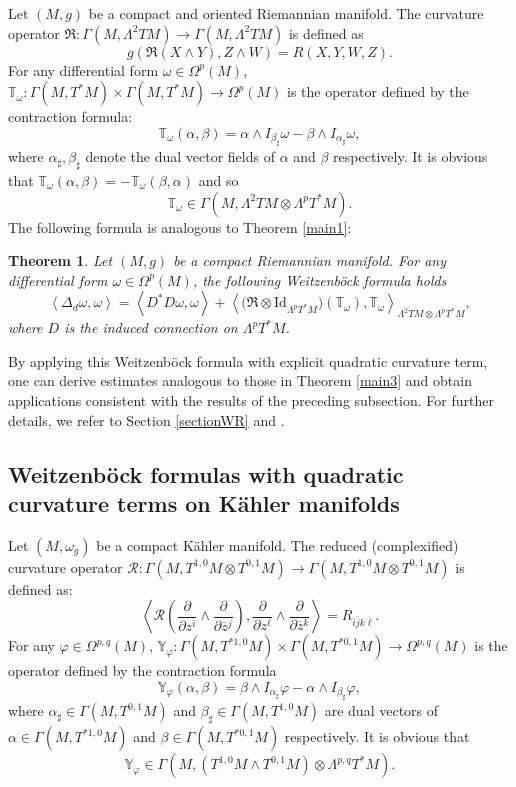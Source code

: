 \documentclass[12pt, reqno]{amsart}
\theoremstyle{plain}
\newtheorem{thm}{Theorem}[section]
\theoremstyle{definition}
\newcommand{\btheorem}{\begin{thm}}
\newcommand{\etheorem}{\end{thm}}
\newcommand{\p}{\partial}
\renewcommand{\bar}{\overline}
\renewcommand{\phi}{\varphi}
\newcommand{\beq}{\begin{equation}}
\newcommand{\eeq}{\end{equation}}
\newcommand{\Om}{\Omega}
\renewcommand{\>}{\rightarrow}
\renewcommand{\#}{\sharp}
\numberwithin{equation}{section} %
\begin{document}
    Let $(M,g)$ be a compact and oriented Riemannian manifold. The curvature operator
    $\mathfrak R: \Gamma(M,\Lambda^2TM) \to \Gamma(M,\Lambda^2TM)$
    is defined as
    \beq
    g(\mathfrak R(X\wedge Y), Z\wedge W) = R(X,Y,W,Z).\eeq
    For any   differential form $\omega\in \Om^{p}(M)$,
    $ \mathbb{T}_\omega: \Gamma(M,T^*M)\times  \Gamma(M,T^*M)\>\Om^{p}(M)$ is the operator defined
    by the contraction formula: \beq  \mathbb T_\omega(\alpha,\beta) =  \alpha \wedge I_{\beta_\#} \omega - \beta \wedge I_{\alpha_\#} \omega,\eeq
    where $ \alpha_\#, \beta_\#  $ denote the dual vector fields of $\alpha$ and $\beta$ respectively.  It is obvious that  $\mathbb T_\omega(\alpha,\beta) =- \mathbb T_\omega(\beta,\alpha)$ and so \beq  \mathbb T_\omega \in \Gamma\left(M,\Lambda^2TM\otimes \Lambda^{p}T^*M\right).\eeq
    \noindent The following formula is analogous to Theorem \ref{main1}:
    \btheorem\label{main8} Let $(M,g)$ be a compact Riemannian manifold.
    For any   differential form $ \omega \in \Omega^p(M) $, the following Weitzenb\"ock formula  holds
    \beq \left\langle\Delta_d \omega, \omega\right\rangle = \left\langle D^*D \omega, \omega\right\rangle + \left\langle \big(\mathfrak{R}\otimes \mathrm{Id}_{\Lambda^pT^*M}\big)\left(\mathbb T_\omega\right),\mathbb T_\omega \right\rangle_{\Lambda^2TM \otimes \Lambda^pT^*M },\eeq
    where $D$ is the induced connection on $\Lambda^pT^*M$.
    \etheorem
    \noindent By applying this Weitzenböck formula with explicit quadratic curvature term, one can derive estimates analogous to those in Theorem \ref{main3} and obtain applications consistent with the results of the preceding subsection. For further details,  we refer to  Section \ref{sectionWR} and \cite{PetersenWink2021a}.


\baselineskip
        \subsection{Weitzenb\"ock formulas with quadratic curvature terms  on  K\"ahler manifolds}
Let $(M,\omega_g) $ be a compact K\"ahler manifold. The reduced (complexified)  curvature operator $ \mathscr{R}: \Gamma(M,T^{1,0}M \otimes T^{0,1}M) \> \Gamma(M,T^{1,0}M \otimes T^{0,1}M)$ is
 defined as:
\beq \left\langle \mathscr{R}\left(\frac{\p}{\p z^i} \wedge \frac{\p}{\p \bar z{}^j}\right), \frac{\p}{\p z^\ell} \wedge \frac{\p}{\p \bar z{}^k}\right\rangle = R_{i\bar j k\bar\ell}. \eeq
For any $ \phi \in \Omega^{p,q}(M) $, $ \mathbb{Y}_\phi: \Gamma(M,T^{*1,0}M) \times \Gamma(M,T^{*0,1}M) \> \Omega^{p,q}(M) $ is the operator defined
by the contraction formula
\beq \mathbb{Y}_\phi(\alpha,\beta) = \beta \wedge I_{\alpha_\#} \phi - \alpha \wedge I_{\beta_\#} \phi, \eeq
where $ \alpha_\# \in \Gamma(M,T^{0,1}M) $ and $ \beta_\# \in \Gamma(M,T^{1,0}M) $ are  dual vectors of $ \alpha \in \Gamma(M,T^{*1,0}M) $ and $ \beta \in \Gamma(M,T^{*0,1}M) $ respectively. It is obvious that
\beq  \mathbb{Y}_\phi \in \Gamma\left(M,\left(T^{1,0}M \wedge T^{0,1}M\right) \otimes \Lambda^{p,q}T^*M\right). \eeq
\end{document}
